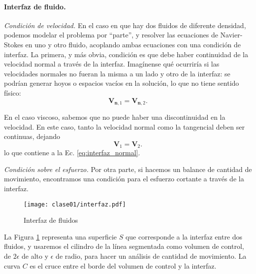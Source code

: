 \paragraph*{Interfaz de fluido.}
\emph{Condición de velocidad.} En el caso en que hay dos fluidos de diferente densidad, podemos modelar el problema por ``parte'', y resolver las ecuaciones de Navier-Stokes en uno y otro fluido, acoplando ambas ecuaciones con una condición de interfaz.
La primera, y más obvia, condición es que debe haber continuidad de la velocidad normal a través de la interfaz.
Imagínense qué ocurriría si las velocidades normales no fueran la misma a un lado y otro de la interfaz: se podrían generar hoyos o espacios vacíos en la solución, lo que no tiene sentido físico:
%
\begin{equation}\label{eq:interfaz_normal}
\mathbf{V}_{\mathbf{n},1}=\mathbf{V}_{\mathbf{n},2}.
\end{equation}

En el caso viscoso, sabemos que no puede haber una discontinuidad en la velocidad. En este caso, tanto la velocidad normal como la tangencial deben ser continuas, dejando
%
\begin{equation}
\mathbf{V}_{1}=\mathbf{V}_{2}.
\end{equation}
%
lo que contiene a la Ec. \eqref{eq:interfaz_normal}.

\emph{Condición sobre el esfuerzo.}
Por otra parte, si hacemos un balance de cantidad de movimiento, encontramos una condición para el esfuerzo cortante a través de la interfaz.
%
\begin{figure}[!h]
\centering
\texttt{[image: clase01/interfaz.pdf]}
\caption{Interfaz de fluidos}
\label{fig:interfaz}
\end{figure}
%
La Figura \ref{fig:interfaz} representa una superficie $S$ que corresponde a la interfaz entre dos fluidos, y usaremos el cilindro de la línea segmentada como volumen de control, de $2\epsilon$ de alto y $\epsilon$ de radio, para hacer un análisis de cantidad de movimiento.
La curva $C$ es el cruce entre el borde del volumen de control y la interfaz.

